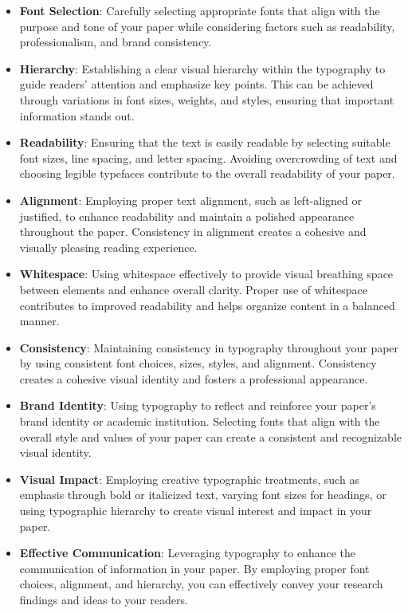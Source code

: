\begin{itemize}
  \item \textbf{Font Selection}: Carefully selecting appropriate fonts that align with the purpose and tone of your paper while considering factors such as readability, professionalism, and brand consistency.
  
  \item \textbf{Hierarchy}: Establishing a clear visual hierarchy within the typography to guide readers' attention and emphasize key points. This can be achieved through variations in font sizes, weights, and styles, ensuring that important information stands out.
  
  \item \textbf{Readability}: Ensuring that the text is easily readable by selecting suitable font sizes, line spacing, and letter spacing. Avoiding overcrowding of text and choosing legible typefaces contribute to the overall readability of your paper.
  
  \item \textbf{Alignment}: Employing proper text alignment, such as left-aligned or justified, to enhance readability and maintain a polished appearance throughout the paper. Consistency in alignment creates a cohesive and visually pleasing reading experience.
  
  \item \textbf{Whitespace}: Using whitespace effectively to provide visual breathing space between elements and enhance overall clarity. Proper use of whitespace contributes to improved readability and helps organize content in a balanced manner.
  
  \item \textbf{Consistency}: Maintaining consistency in typography throughout your paper by using consistent font choices, sizes, styles, and alignment. Consistency creates a cohesive visual identity and fosters a professional appearance.
  
  \item \textbf{Brand Identity}: Using typography to reflect and reinforce your paper's brand identity or academic institution. Selecting fonts that align with the overall style and values of your paper can create a consistent and recognizable visual identity.
  
  \item \textbf{Visual Impact}: Employing creative typographic treatments, such as emphasis through bold or italicized text, varying font sizes for headings, or using typographic hierarchy to create visual interest and impact in your paper.
  
  \item \textbf{Effective Communication}: Leveraging typography to enhance the communication of information in your paper. By employing proper font choices, alignment, and hierarchy, you can effectively convey your research findings and ideas to your readers.
\end{itemize}




